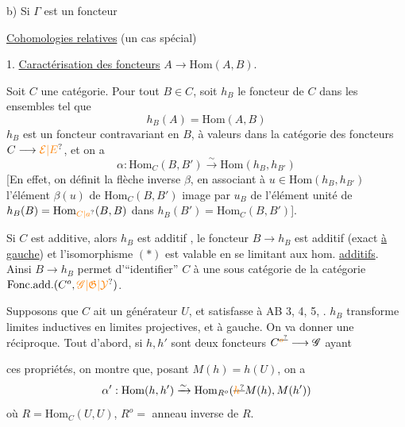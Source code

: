 b) Si $\Gamma$ est un foncteur

\uline{Cohomologies relatives} (un cas spécial)

1. \uline{Caractérisation des foncteurs} $A\longrightarrow\mathrm{Hom}(A,B)$.

Soit $C$ une catégorie. Pour tout $B\in C$, soit $h_B$ le foncteur de $C$ dans les ensembles tel que
\[
 h_B(A)=\mathrm{Hom}(A,B)
\]
$h_B$ est un foncteur  contravariant en $B$, à valeurs dans la catégorie des foncteurs $C\longrightarrow\unsure{\mathcal E|E}$, et on a
\[
 \alpha:\mathrm{Hom}_C(B,B')\xrightarrow{\sim}\mathrm{Hom}(h_B,h_{B'}) \tag*{(*)}
\]
[En effet, on définit la flèche inverse $\beta$, en associant à  $u\in\mathrm{Hom}(h_B,h_{B'})$  l'élément $\beta(u)$ de $\mathrm{Hom}_C(B,B')$ image par $u_B$ de l'élément unité de $h_B(B)=\mathrm{Hom}_{\unsure{C|a}}(B,B)$ dans $h_B(B')=\mathrm{Hom}_C(B,B')$].

 Si $C$ est additive, alors $h_B$ est additif , le foncteur $B\longrightarrow h_B$ est additif (exact \uline{à gauche}) et l'isomorphisme $(*)$ est valable en se limitant aux hom. \uline{additifs}. Ainsi $B\longrightarrow h_B$  permet d'``identifier'' $C$ à une sous catégorie de la catégorie $\mathrm{Fonc.add.}(C^o,\unsure{\mathscr G|\mathfrak G|\mathcal Y})$.

Supposons que $C$ ait un générateur $U$, et  satisfasse à AB 3, 4, 5, .    $h_B$ transforme limites inductives en limites projectives, et   à gauche. On va donner une réciproque. Tout d'abord, si $h,h'$ sont deux foncteurs  $C^{\deleted{\unsure{o}}}\longrightarrow\mathscr G$ ayant

ces propriétés, on montre que, posant $M(h)=h(U)$, on  a
\[
 \alpha':\mathrm{Hom}(h,h')\xrightarrow{\sim}\mathrm{Hom}_{R^o}(\deleted{\unsure{h}}M(h),M(h'))
\]
où $R=\mathrm{Hom}_C(U,U)$, $R^o=$ anneau inverse de $R$.

